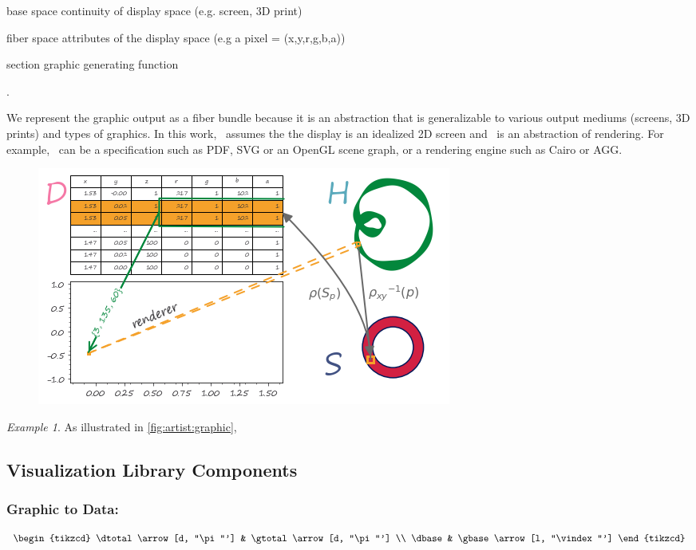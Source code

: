 \documentclass[10pt,journal,compsoc]{IEEEtran}
\theoremstyle{definition}
\theoremstyle{remark}
\newtheorem{example}{Example}[section]
\begin{document}
\begin{LaTeXdescription}
\item [\textcolor{base}{base space} \gbase] continuity of display space (e.g. screen, 3D print)
\item [\textcolor{fiber}{fiber space} \gfiber] attributes of the display space (e.g a pixel = (x,y,r,g,b,a))
\item [\textcolor{section}{section} \gsection] graphic generating function
\end{LaTeXdescription}.

We represent the graphic output as a fiber bundle because it is an abstraction that is generalizable to various output mediums (screens, 3D prints) and types of graphics. In this work, \gtotal\ assumes the the display is an idealized 2D screen and \gsection\ is an abstraction of rendering. For example, \gsection\ can be a specification such as PDF\cite{bienz1993portable}, SVG\cite{quintScalable2003} or an OpenGL scene graph\cite{CarsonOpenGL1997}, or a rendering engine such as Cairo\cite{CairographicsOrg} or AGG\cite{shemanarevAntiGrainGeometry}.

\begin{figure}[h!]
  \includegraphics[width=\columnwidth]{render.png}
  \caption{}
  \label{fig:artist:graphic}
\end{figure}

\begin{example}
As illustrated in \autoref{fig:artist:graphic}, 
\end{example}

\subsection{Visualization Library Components}
\subsubsection{Graphic to Data: \vindex}
\begin{equation}
  \begin{tikzcd}
      \dtotal \arrow[d, "\pi"'] & \gtotal \arrow[d, "\pi"'] \\
      \dbase                   & \gbase \arrow[l, "\vindex"']
  \end{tikzcd}
  \label{eq:math:graphic:vindex}
\end{equation}
\end{document}
